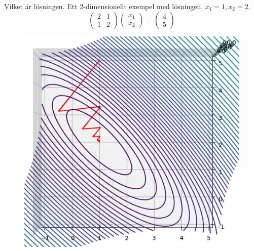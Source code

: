 \documentclass{article}
\begin{document}
Vilket är lösningen.
\newpage
Ett 2-dimensionellt exempel med lösningen, $x_1 = 1, x_2 = 2$.
\begin{equation*}
\left(
    \begin{matrix}
        2 & 1 \\
        1 & 2
    \end{matrix}
    \right) 
\left(
    \begin{matrix}
        x_1 \\
        x_2
    \end{matrix}
\right) = 
\left(
    \begin{matrix}
        4 \\
        5
    \end{matrix}
\right)
\end{equation*}

\begin{figure} 
    \includegraphics[width=\textwidth]{exempel.png}
  \end{figure}
\newpage  
\end{document}
